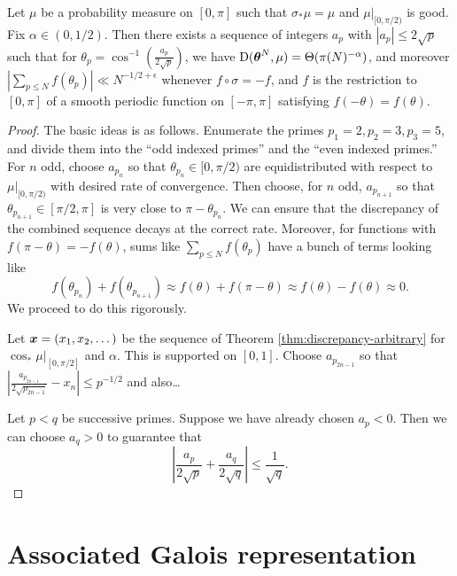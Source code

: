 \begin{theorem}
Let $\mu$ be a probability measure on $[0,\pi]$ such that 
$\sigma_\ast\mu = \mu$ and $\left.\mu\right|_{[0,\pi/2)}$ is good. Fix 
$\alpha\in (0,1/2)$. Then there exists a sequence of integers $a_p$ with 
$|a_p|\leqslant 2\sqrt p$ such that for 
$\theta_p =\cos^{-1}\left( \frac{a_p}{2\sqrt p}\right)$, we have 
$\operatorname{D}({\boldsymbol\theta}^N,\mu) = \Theta(\pi(N)^{-\alpha})$, and moreover 
$\left| \sum_{p\leqslant N} f(\theta_p)\right| \ll N^{-1/2+\epsilon}$ 
whenever $f\circ \sigma = - f$, and $f$ is the restriction to $[0,\pi]$ of a 
smooth periodic function on $[-\pi,\pi]$ satisfying $f(-\theta) = f(\theta)$. 
\end{theorem}
\begin{proof}
The basic ideas is as follows. Enumerate the primes 
$p_1 =2, p_2 = 3, p_3 = 5$, and divide them into the ``odd indexed primes'' and 
the ``even indexed primes.'' For $n$ odd, choose $a_{p_n}$ so that 
$\theta_{p_n}\in [0,\pi/2)$ are equidistributed with respect to 
$\left.\mu\right|_{[0,\pi/2)}$ with desired rate of convergence. Then choose, 
for $n$ odd, $a_{p_{n+1}}$ so that $\theta_{p_{n+1}}\in [\pi/2,\pi]$ is very 
close to $\pi-\theta_{p_n}$. We can ensure that the discrepancy of the 
combined sequence decays at the correct rate. Moreover, for functions with  
$f(\pi-\theta) = -f(\theta)$, sums like $\sum_{p\leqslant N} f(\theta_p)$ 
have a bunch of terms looking like 
\[
	f(\theta_{p_n}) + f(\theta_{p_{n+1}})\approx f(\theta) + f(\pi-\theta) \approx f(\theta) - f(\theta) \approx 0 .
\]
We proceed to do this rigorously. 

Let ${\boldsymbol x}=(x_1,x_2,\dots)$ be the sequence of Theorem 
\ref{thm:discrepancy-arbitrary} for $\cos_\ast \left. \mu\right|_{[0,\pi/2]}$ 
and $\alpha$. This is supported on $[0,1]$. Choose $a_{p_{2n-1}}$ so that 
$\left| \frac{a_{p_{2n-1}}}{2\sqrt{p_{2n-1}}} - x_n\right| \leqslant p^{-1/2}$ 
and also\ldots

Let $p<q$ be successive primes. Suppose we have already chosen $a_p<0$. Then 
we can choose $a_q>0$ to guarantee that 
\[
	\left| \frac{a_p}{2\sqrt p} + \frac{a_q}{2\sqrt q}\right| \leqslant \frac{1}{\sqrt q} .
\]

\end{proof}





\section{Associated Galois representation}



